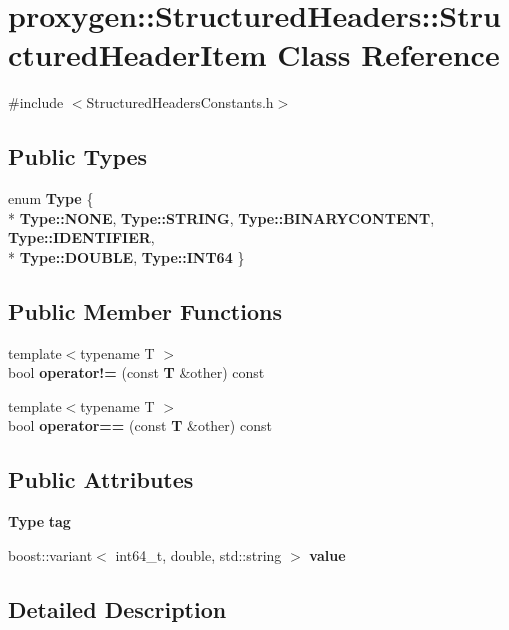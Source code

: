 \section{proxygen\+:\+:Structured\+Headers\+:\+:Structured\+Header\+Item Class Reference}
\label{classproxygen_1_1StructuredHeaders_1_1StructuredHeaderItem}


{\ttfamily \#include $<$Structured\+Headers\+Constants.\+h$>$}

\subsection*{Public Types}
\begin{DoxyCompactItemize}
\item 
enum {\bf Type} \{ \\*
{\bf Type\+::\+N\+O\+NE}, 
{\bf Type\+::\+S\+T\+R\+I\+NG}, 
{\bf Type\+::\+B\+I\+N\+A\+R\+Y\+C\+O\+N\+T\+E\+NT}, 
{\bf Type\+::\+I\+D\+E\+N\+T\+I\+F\+I\+ER}, 
\\*
{\bf Type\+::\+D\+O\+U\+B\+LE}, 
{\bf Type\+::\+I\+N\+T64}
 \}
\end{DoxyCompactItemize}
\subsection*{Public Member Functions}
\begin{DoxyCompactItemize}
\item 
{\footnotesize template$<$typename T $>$ }\\bool {\bf operator!=} (const {\bf T} \&other) const 
\item 
{\footnotesize template$<$typename T $>$ }\\bool {\bf operator==} (const {\bf T} \&other) const 
\end{DoxyCompactItemize}
\subsection*{Public Attributes}
\begin{DoxyCompactItemize}
\item 
{\bf Type} {\bf tag}
\item 
boost\+::variant$<$ int64\+\_\+t, double, std\+::string $>$ {\bf value}
\end{DoxyCompactItemize}


\subsection{Detailed Description}


